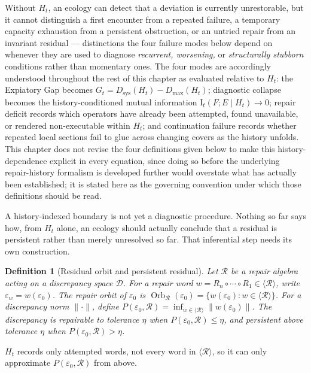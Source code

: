 \documentclass[12pt]{report}
\newtheorem{definition}{Definition}[section]
\newcommand{\I}{\ensuremath{\mathrm{I}}}
\begin{document}
Without $H_t$, an ecology can detect that a deviation is currently
unrestorable, but it cannot distinguish a first encounter from a repeated
failure, a temporary capacity exhaustion from a persistent obstruction, or
an untried repair from an invariant residual --- distinctions the four
failure modes below depend on whenever they are used to diagnose
\emph{recurrent, worsening,} or \emph{structurally stubborn} conditions
rather than momentary ones. The four modes are accordingly understood
throughout the rest of this chapter as evaluated relative to $H_t$: the
Expiatory Gap becomes $G_t = D_{\mathrm{sys}}(H_t) - D_{\max}(H_t)$;
diagnostic collapse becomes the history-conditioned mutual information
$\I_t(F;E \mid H_t) \to 0$; repair deficit records which operators have
already been attempted, found unavailable, or rendered non-executable
within $H_t$; and continuation failure records whether repeated local
sections fail to glue across changing covers as the history unfolds. This
chapter does not revise the four definitions given below to make this
history-dependence explicit in every equation, since doing so before the
underlying repair-history formalism is developed further would overstate
what has actually been established; it is stated here as the governing
convention under which those definitions should be read.

A history-indexed boundary is not yet a diagnostic procedure. Nothing so
far says how, from $H_t$ alone, an ecology should actually conclude that
a residual is persistent rather than merely unresolved so far. That
inferential step needs its own construction.

\begin{definition}[Residual orbit and persistent residual]
\label{def:residual-orbit}
Let $\mathcal{R}$ be a repair algebra acting on a discrepancy space
$\mathcal{D}$. For a repair word $w = R_n \circ \cdots \circ R_1 \in
\langle \mathcal{R} \rangle$, write $\varepsilon_w = w(\varepsilon_0)$.
The repair orbit of $\varepsilon_0$ is $\operatorname{Orb}_\mathcal{R}(\varepsilon_0)
= \{w(\varepsilon_0) : w \in \langle\mathcal{R}\rangle\}$. For a
discrepancy norm $\|\cdot\|$, define $P(\varepsilon_0,\mathcal{R}) =
\inf_{w \in \langle\mathcal{R}\rangle} \|w(\varepsilon_0)\|$. The
discrepancy is \emph{repairable to tolerance $\eta$} when
$P(\varepsilon_0,\mathcal{R}) \leq \eta$, and \emph{persistent above
tolerance $\eta$} when $P(\varepsilon_0,\mathcal{R}) > \eta$.
\end{definition}

$H_t$ records only attempted words, not every word in $\langle\mathcal{R}\rangle$,
so it can only approximate $P(\varepsilon_0,\mathcal{R})$ from above.
\end{document}
